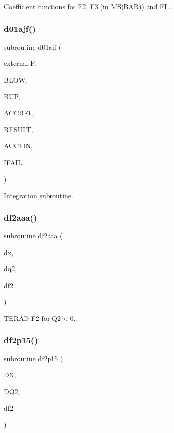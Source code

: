 Coefficient functions for F2, F3 (in M\+S(\+B\+A\+R)) and FL. 

\mbox{\label{djangoh__h_8f_a5575d5270ee0e5cede47701657715310}} 
\subsubsection{\texorpdfstring{d01ajf()}{d01ajf()}}
{\footnotesize\ttfamily subroutine d01ajf (\begin{DoxyParamCaption}\item[{external}]{F,  }\item[{}]{B\+L\+OW,  }\item[{}]{B\+UP,  }\item[{}]{A\+C\+C\+R\+EL,  }\item[{}]{R\+E\+S\+U\+LT,  }\item[{}]{A\+C\+C\+F\+IN,  }\item[{}]{I\+F\+A\+IL }\end{DoxyParamCaption})}



Integration subroutine. 

\mbox{\label{djangoh__h_8f_a9c1d49c79978a27e782b40d36813ac68}} 
\subsubsection{\texorpdfstring{df2aaa()}{df2aaa()}}
{\footnotesize\ttfamily subroutine df2aaa (\begin{DoxyParamCaption}\item[{}]{dx,  }\item[{}]{dq2,  }\item[{}]{df2 }\end{DoxyParamCaption})}



T\+E\+R\+AD F2 for Q2$<$0.. 

\mbox{\label{djangoh__h_8f_a4b60d6f62111a87a451b64de759d0f77}} 
\subsubsection{\texorpdfstring{df2p15()}{df2p15()}}
{\footnotesize\ttfamily subroutine df2p15 (\begin{DoxyParamCaption}\item[{}]{DX,  }\item[{}]{D\+Q2,  }\item[{}]{df2 }\end{DoxyParamCaption})}




